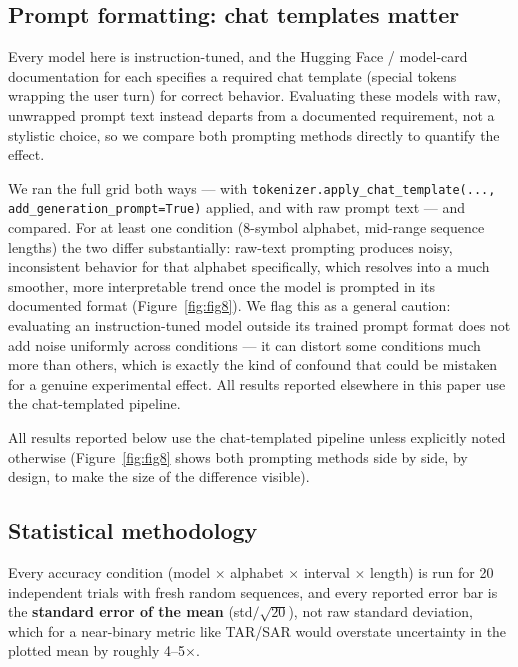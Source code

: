 \documentclass[11pt]{article}
\begin{document}
\subsection{Prompt formatting: chat templates matter}
\label{sec:chat-template}

Every model here is instruction-tuned, and the Hugging Face / model-card documentation for each specifies a required chat template (special tokens wrapping the user turn) for correct behavior. Evaluating these models with raw, unwrapped prompt text instead departs from a documented requirement, not a stylistic choice, so we compare both prompting methods directly to quantify the effect.

We ran the full grid both ways --- with \texttt{tokenizer.apply\_chat\_template(..., add\_generation\_prompt=True)} applied, and with raw prompt text --- and compared. For at least one condition (8-symbol alphabet, mid-range sequence lengths) the two differ substantially: raw-text prompting produces noisy, inconsistent behavior for that alphabet specifically, which resolves into a much smoother, more interpretable trend once the model is prompted in its documented format (Figure~\ref{fig:fig8}). We flag this as a general caution: evaluating an instruction-tuned model outside its trained prompt format does not add noise uniformly across conditions --- it can distort some conditions much more than others, which is exactly the kind of confound that could be mistaken for a genuine experimental effect. All results reported elsewhere in this paper use the chat-templated pipeline.

All results reported below use the chat-templated pipeline unless explicitly noted otherwise (Figure~\ref{fig:fig8} shows both prompting methods side by side, by design, to make the size of the difference visible).

\subsection{Statistical methodology}
\label{sec:stats-methods}

Every accuracy condition (model $\times$ alphabet $\times$ interval $\times$ length) is run for 20 independent trials with fresh random sequences, and every reported error bar is the \textbf{standard error of the mean} (std$/\sqrt{20}$), not raw standard deviation, which for a near-binary metric like TAR/SAR would overstate uncertainty in the plotted mean by roughly 4--5$\times$.
\end{document}
